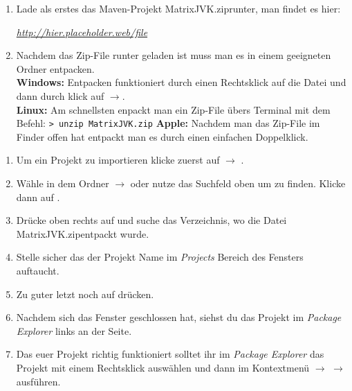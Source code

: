 
\newcommand{\jvkpackage}{MatrixJVK.zip}
\newcommand{\jvkpackageurl}{http://hier.placeholder.web/file}


\begin{Infobox}
    \begin{enumerate}[label=\arabic*.]
        \item Lade als erstes das Maven-Projekt \jvkpackage runter, man findet es hier:
        \begin{center}
            \color{blue}\href{\jvkpackageurl}{\textit{\jvkpackageurl}}
        \end{center}

        \item Nachdem das Zip-File runter geladen ist muss man es in einem geeigneten Ordner entpacken.\\
        \textbf{Windows:} Entpacken funktioniert durch einen Rechtsklick auf die Datei und dann durch klick auf $\to$.\\
        \textbf{Linux:} Am schnellsten enpackt man ein Zip-File übers Terminal mit dem Befehl:
        \newline\hspace*{\fill}\texttt{\textgreater\ unzip \jvkpackage}\hspace*{\fill}\newline
        \textbf{Apple:} Nachdem man das Zip-File im Finder offen hat entpackt man es durch einen einfachen Doppelklick.
    \end{enumerate}
\end{Infobox}

\begin{Infobox}
    \begin{enumerate}[label=\arabic*.]
        \item Um ein Projekt zu importieren klicke zuerst auf  $\to$ .
        \item Wähle in dem Ordner  $\to$  oder nutze das Suchfeld oben um  zu finden. Klicke dann auf .
        \item Drücke oben rechts auf  und suche das Verzeichnis, wo die Datei \jvkpackage entpackt wurde.
        \item Stelle sicher das der Projekt Name im \textit{Projects} Bereich des Fensters auftaucht.
        \item Zu guter letzt noch auf  drücken.
        \item Nachdem sich das Fenster geschlossen hat, siehst du das Projekt im \textit{Package Explorer} links an der Seite.
        \item Das euer Projekt richtig funktioniert solltet ihr im \textit{Package Explorer} das Projekt mit einem Rechtsklick auswählen und dann im Kontextmenü  $\to$  $\to$  ausführen.
    \end{enumerate}
\end{Infobox}

